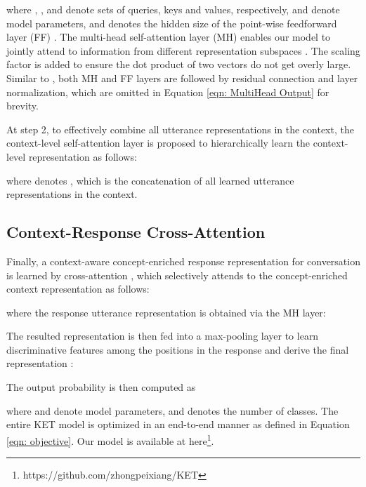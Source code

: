 \documentclass[11pt,a4paper]{article}
\begin{document}
where , , and  denote sets of queries, keys and values, respectively,  and  denote model parameters, and  denotes the hidden size of the point-wise feedforward layer (FF) \cite{vaswani2017attention}. The multi-head self-attention layer (MH) enables our model to jointly attend to information from different representation subspaces \cite{vaswani2017attention}. The scaling factor  is added to ensure the dot product of two vectors do not get overly large. Similar to \cite{vaswani2017attention}, both MH and FF layers are followed by residual connection and layer normalization, which are omitted in Equation \ref{eqn: MultiHead Output} for brevity.

At step 2, to effectively combine all utterance representations in the context, the context-level self-attention layer is proposed to hierarchically learn the context-level representation  as follows:

where  denotes , which is the concatenation of all learned utterance representations in the context.

\subsection{Context-Response Cross-Attention}
Finally, a context-aware concept-enriched response representation  for conversation  is learned by cross-attention \cite{bahdanau2014neural}, which selectively attends to the concept-enriched context representation as follows:

where the response utterance representation  is obtained via the MH layer:


The resulted representation  is then fed into a max-pooling layer to learn discriminative features among the positions in the response and derive the final representation :

The output probability  is then computed as

where  and  denote model parameters, and  denotes the number of classes. The entire KET model is optimized in an end-to-end manner as defined in Equation \ref{eqn: objective}. Our model is available at here\footnote{https://github.com/zhongpeixiang/KET}.
\end{document}
